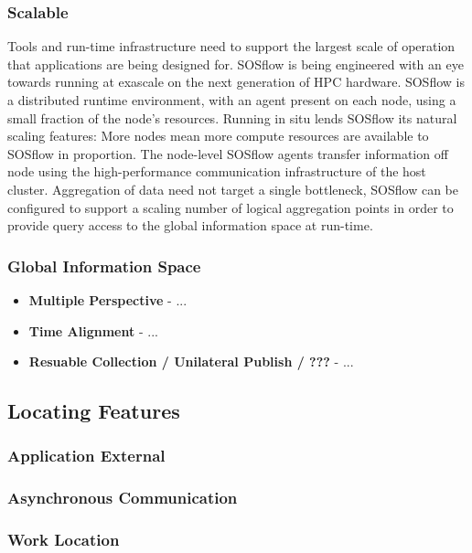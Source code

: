 \subsubsection{Scalable}
%
Tools and run-time infrastructure need to support the largest scale of
operation that applications are being designed for.
%
SOSflow is being engineered with an eye towards running at exascale
on the next generation of HPC hardware.
%
SOSflow is a distributed runtime environment, with an agent present
on each node, using a small fraction of the node's resources.
%
Running in situ lends SOSflow its natural scaling features: More nodes
mean more compute resources are available to SOSflow in proportion.
%
The node-level SOSflow agents transfer information off node using
the high-performance communication infrastructure of the host cluster.
%
Aggregation of data need not target a single bottleneck, SOSflow can
be configured to support a scaling number of logical aggregation points
in order to provide query access to the global information space at
run-time.
%
\subsubsection{Global Information Space}
     \begin{itemize}
        \item \textbf{Multiple Perspective} - ...
        \item \textbf{Time Alignment} - ...
        \item \textbf{Resuable Collection / Unilateral Publish / ???} - ...
     \end{itemize}
\subsection{Locating Features}
\subsubsection{Application External}
\subsubsection{Asynchronous Communication}
\subsubsection{Work Location}

